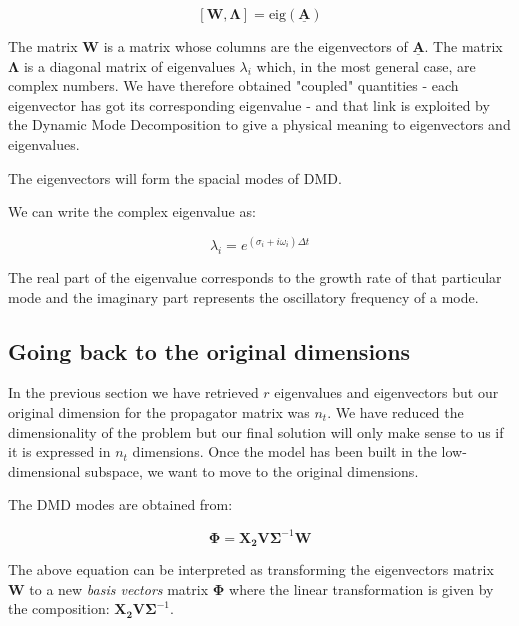 \documentclass[10pt,twocolumn]{article}
\begin{document}
\begin{equation} \label{eq:A_underline}
[\mathbf{W}, \mathbf{\Lambda}] = \text{eig}(\underline{\mathbf{A}})
\end{equation}

The matrix $\mathbf{W}$ is a matrix whose columns are the eigenvectors of $\underline{\mathbf{A}}$. The matrix $\mathbf{\Lambda}$ is a diagonal matrix of eigenvalues $\lambda_i$ which, in the most general case, are complex numbers. We have therefore obtained "coupled" quantities - each eigenvector has got its corresponding eigenvalue - and that link is exploited by the Dynamic Mode Decomposition to give a physical meaning to eigenvectors and eigenvalues.

The eigenvectors will form the spacial modes of DMD. 

We can write the complex eigenvalue as:

\begin{equation} \label{eq:A_underline}
\lambda_i = e^{(\sigma_i + i \omega_i) \Delta t} 
\end{equation}

The real part of the eigenvalue corresponds to the growth rate of that particular mode and the imaginary part represents the oscillatory frequency of a mode.

\subsection{Going back to the original dimensions}

In the previous section we have retrieved $r$ eigenvalues and eigenvectors but our original dimension for the propagator matrix was $n_t$. We have reduced the dimensionality of the problem but our final solution will only make sense to us if it is expressed in $n_t$ dimensions.
Once the model has been built in the low-dimensional subspace, we want to move to the original dimensions. 

The DMD modes are obtained from:

\begin{equation} \label{eq:A_underline}
\mathbf{\Phi} = \mathbf{X_2} \mathbf{V} \mathbf{\Sigma}^{-1} \mathbf{W}
\end{equation}

The above equation can be interpreted as transforming the eigenvectors matrix $\mathbf{W}$ to a new \textit{basis vectors} matrix $\mathbf{\Phi}$ where the linear transformation is given by the composition: $\mathbf{X_2} \mathbf{V} \mathbf{\Sigma}^{-1}$.
\end{document}
